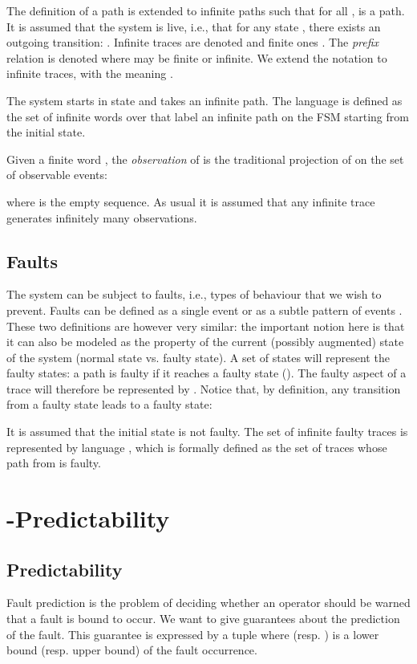 \documentclass{article}
\begin{document}
The definition of a path is extended to infinite paths 
 such that for all , 
 is a path.  
It is assumed that the system is live, 
i.e., that for any state , there exists an outgoing transition: 
.  
Infinite traces are denoted  and finite ones .  
The \emph{prefix} relation is denoted  
where  may be finite or infinite.  
We extend the notation  to infinite traces, 
with the meaning .  

The system starts in state  
and takes an infinite path.  
The language  
is defined as the set of infinite words over  
that label an infinite path on the FSM starting from the initial state.  

Given a finite word , 
the \emph{observation} of  is the traditional projection 
of  on the set of observable events: 

where  is the empty sequence.  
As usual it is assumed that any infinite trace 
generates infinitely many observations.  

\subsection{Faults}

The system can be subject to faults, 
i.e., types of behaviour that we wish to prevent.  
Faults can be defined as a single event 
or as a subtle pattern of events \cite{jeron-etal::dx::06}.  
These two definitions are however very similar: 
the important notion here 
is that it can also be modeled as the property 
of the current (possibly augmented) state of the system 
(normal state vs. faulty state).  
A set  of states will represent the faulty states: 
a path is faulty if it reaches a faulty state 
().  
The faulty aspect of a trace  
will therefore be represented by .  
Notice that, by definition, any transition from a faulty state 
leads to a faulty state: 

It is assumed that the initial state is not faulty.  
The set of infinite faulty traces is represented 
by language , 
which is formally defined as the set of traces 
whose path from  is faulty.  

\section{-Predictability}
\label{sec::defi}
\subsection{Predictability}

Fault prediction is the problem of deciding 
whether an operator should be warned that a fault is bound to occur.  
We want to give guarantees about the prediction of the fault.  
This guarantee is expressed by a tuple  
where  (resp. ) is a lower bound (resp. upper bound) 
of the fault occurrence.  
\end{document}
